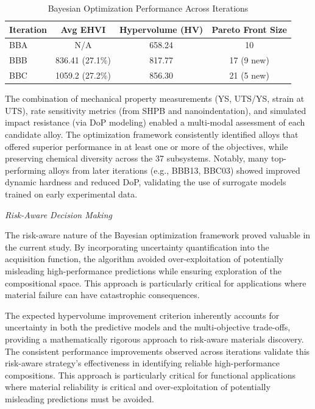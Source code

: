 \begin{table}[H]
\centering
\caption{Bayesian Optimization Performance Across Iterations}
\label{tab:bo_metrics}
\begin{tabular}{lccc}
\toprule
\textbf{Iteration} & \textbf{Avg EHVI} & \textbf{Hypervolume (HV)} & \textbf{Pareto Front Size} \\
\midrule
BBA & N/A & 658.24 & 10 \\
BBB & 836.41 (27.1\%) & 817.77 & 17 (9 new) \\
BBC & 1059.2 (27.2\%) & 856.30 & 21 (5 new) \\
\bottomrule
\end{tabular}
\end{table}


The combination of mechanical property measurements (YS, UTS/YS, strain at UTS), rate sensitivity metrics (from SHPB and nanoindentation), and simulated impact resistance (via DoP modeling) enabled a multi-modal assessment of each candidate alloy. The optimization framework consistently identified alloys that offered superior performance in at least one or more of the objectives, while preserving chemical diversity across the 37 subsystems. Notably, many top-performing alloys from later iterations (e.g., BBB13, BBC03) showed improved dynamic hardness and reduced DoP, validating the use of surrogate models trained on early experimental data.



\emph{Risk-Aware Decision Making}

The risk-aware nature of the Bayesian optimization framework proved valuable in the current study. By incorporating uncertainty quantification into the acquisition function, the algorithm avoided over-exploitation of potentially misleading high-performance predictions while ensuring exploration of the compositional space. This approach is particularly critical for applications where material failure can have catastrophic consequences.

The expected hypervolume improvement criterion inherently accounts for uncertainty in both the predictive models and the multi-objective trade-offs, providing a mathematically rigorous approach to risk-aware materials discovery. The consistent performance improvements observed across iterations validate this risk-aware strategy's effectiveness in identifying reliable high-performance compositions. This approach is particularly critical for functional applications where material reliability is critical and over-exploitation of potentially misleading predictions must be avoided.


